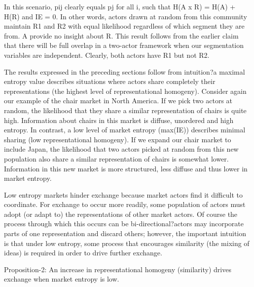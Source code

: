 	In this scenario, pij clearly equals pj for all i, such that H(A x R) = H(A) + H(R) and IE = 0. In other words, actors drawn at random from this community maintain R1 and R2 with equal likelihood regardless of which segment they are from. {A} provide no insight about {R}. This result follows from the earlier claim that there will be full overlap in a two-actor framework when our segmentation variables are independent. Clearly, both actors have R1 but not R2.
 
The results expressed in the preceding sections follow from intuition?a maximal entropy value describes situations where actors share completely their representations (the highest level of representational homogeny). Consider again our example of the chair market in North America. If we pick two actors at random, the likelihood that they share a similar representation of chairs is quite high. Information about chairs in this market is diffuse, unordered and high entropy. In contrast, a low level of market entropy (max(IE)) describes minimal sharing (low representational homogeny). If we expand our chair market to include Japan, the likelihood that two actors picked at random from this new population also share a similar representation of chairs is somewhat lower. Information in this new market is more structured, less diffuse and thus lower in market entropy. 
 
Low entropy markets hinder exchange because market actors find it difficult to coordinate. For exchange to occur more readily, some population of actors must adopt (or adapt to) the representations of other market actors. Of course the process through which this occurs can be bi-directional?actors may incorporate parts of one representation and discard others; however, the important intuition is that under low entropy, some process that encourages similarity (the mixing of ideas) is required in order to drive further exchange.
 
Proposition-2: An increase in representational homogeny (similarity) drives exchange when market entropy is low.
 

